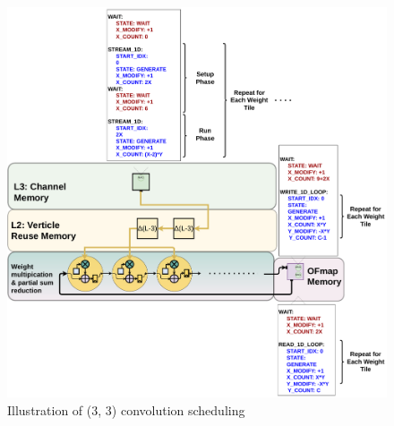 \begin{figure}[ht]
    \centering
    \includegraphics[scale=0.495]{fig/3x3conv_sched.pdf}
    \caption{Illustration of (3, 3) convolution scheduling}
    \label{fig:3x3conv_sched}
\end{figure}